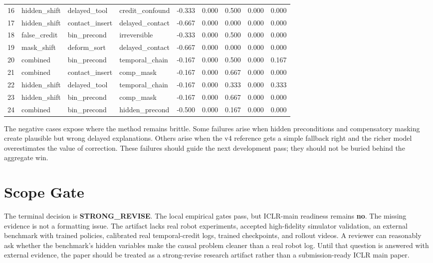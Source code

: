 \documentclass{article}
\begin{document}
\begin{longtable}{@{}rllllrrrr@{}}
16 & hidden\_shift & delayed\_tool & credit\_confound & -0.333 & 0.000 & 0.500 & 0.000 & 0.000 \\
17 & hidden\_shift & contact\_insert & delayed\_contact & -0.667 & 0.000 & 0.000 & 0.000 & 0.000 \\
18 & false\_credit & bin\_precond & irreversible & -0.333 & 0.000 & 0.500 & 0.000 & 0.000 \\
19 & mask\_shift & deform\_sort & delayed\_contact & -0.667 & 0.000 & 0.000 & 0.000 & 0.000 \\
20 & combined & bin\_precond & temporal\_chain & -0.167 & 0.000 & 0.500 & 0.000 & 0.167 \\
21 & combined & contact\_insert & comp\_mask & -0.167 & 0.000 & 0.667 & 0.000 & 0.000 \\
22 & hidden\_shift & delayed\_tool & temporal\_chain & -0.167 & 0.000 & 0.333 & 0.000 & 0.333 \\
23 & hidden\_shift & bin\_precond & comp\_mask & -0.167 & 0.000 & 0.667 & 0.000 & 0.000 \\
24 & combined & bin\_precond & hidden\_precond & -0.500 & 0.000 & 0.167 & 0.000 & 0.000 \\
\bottomrule
\end{longtable}

The negative cases expose where the method remains brittle. Some failures arise when hidden preconditions and compensatory masking create plausible but wrong delayed explanations. Others arise when the v4 reference gets a simple fallback right and the richer model overestimates the value of correction. These failures should guide the next development pass; they should not be buried behind the aggregate win.

\section{Scope Gate}
The terminal decision is \textbf{STRONG\_REVISE}. The local empirical gates pass, but ICLR-main readiness remains \textbf{no}. The missing evidence is not a formatting issue. The artifact lacks real robot experiments, accepted high-fidelity simulator validation, an external benchmark with trained policies, calibrated real temporal-credit logs, trained checkpoints, and rollout videos. A reviewer can reasonably ask whether the benchmark's hidden variables make the causal problem cleaner than a real robot log. Until that question is answered with external evidence, the paper should be treated as a strong-revise research artifact rather than a submission-ready ICLR main paper.
\end{document}
